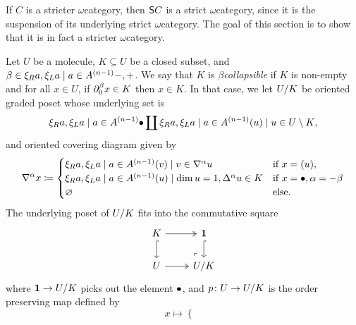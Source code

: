 \noindent If \( C \) is a stricter \( \omega \)\nbd category, then \( \sus{C} \) is a strict \( \omega \)\nbd category, since it is the suspension of its underlying strict \( \omega \)\nbd category.
The goal of this section is to show that it is in fact a stricter \( \omega \)\nbd category. 

\begin{dfn} 
    Let \( U \) be a molecule, \( K \subseteq U \) be a closed subset, and \( \beta \in \set{-, +} \).
    We say that \( K \) is \emph{\( \beta \)\nbd collapsible} if \( K \) is non-empty and for all \( x \in U \), if \( \bd{0}{\beta} x \in K \) then \( x \in K \).
    In that case, we let \( \coll K U \) be oriented graded poset whose underlying set is
    \begin{equation*}
        \set{\zcoll} \coprod \set{\icoll u \mid u \in U \setminus K},
    \end{equation*}
    and oriented covering diagram given by
    \begin{equation*}
        \cofaces{}{\a} x \eqdef
        \begin{cases}
            \set{ \icoll v \mid v \in \cofaces{}{\a} u} & \text{if } x = \icoll u,\\
            \set{ \icoll u \mid \dim u = 1, \faces{}{\a} u \in K} &\text{if } x = \bullet, \a = -\beta\\
            \varnothing &\text{else.}
        \end{cases}
    \end{equation*}
    The underlying poset of \( \coll{K}{U} \) fits into the commutative square
    \begin{equation} \label{tik:square_collapse}
        \begin{tikzcd} 
            K & \pt \\
            U & {\coll K U}
            \arrow[""{name=0, anchor=center, inner sep=0}, two heads, from=1-1, to=1-2]
            \arrow[hook, from=1-1, to=2-1]
            \arrow[hook, from=1-2, to=2-2]
            \arrow[two heads, from=2-1, to=2-2]
            \arrow["\lrcorner"{anchor=center, pos=0.125, rotate=180}, draw=none, from=2-2, to=0]
        \end{tikzcd}
    \end{equation}
    where \( \pt \to \coll{K}{U} \) picks out the element \( \zcoll \), and \( \mapcoll \colon U \to \coll{K}{U} \) is the order preserving map defined by
    \begin{equation*}
        x \mapsto
        \begin{cases}

\end{cases}
\end{equation*}
\end{dfn}

